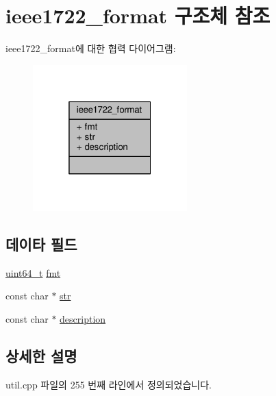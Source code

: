 \hypertarget{structavdecc__lib_1_1utility_1_1ieee1722__format}{}\section{ieee1722\+\_\+format 구조체 참조}
\label{structavdecc__lib_1_1utility_1_1ieee1722__format}


ieee1722\+\_\+format에 대한 협력 다이어그램\+:
\nopagebreak
\begin{figure}[H]
\begin{center}
\leavevmode
\includegraphics[width=169pt]{structavdecc__lib_1_1utility_1_1ieee1722__format__coll__graph}
\end{center}
\end{figure}
\subsection*{데이타 필드}
\begin{DoxyCompactItemize}
\item 
\hyperlink{parse_8c_aec6fcb673ff035718c238c8c9d544c47}{uint64\+\_\+t} \hyperlink{structavdecc__lib_1_1utility_1_1ieee1722__format_affa944a371d714ce1474de9a9ef7b6f8}{fmt}
\item 
const char $\ast$ \hyperlink{structavdecc__lib_1_1utility_1_1ieee1722__format_af25d6dc49269fa2003ac7c7fa6f13915}{str}
\item 
const char $\ast$ \hyperlink{structavdecc__lib_1_1utility_1_1ieee1722__format_a68344fa88cf4e86b5079fd69a5c22d57}{description}
\end{DoxyCompactItemize}


\subsection{상세한 설명}


util.\+cpp 파일의 255 번째 라인에서 정의되었습니다.



